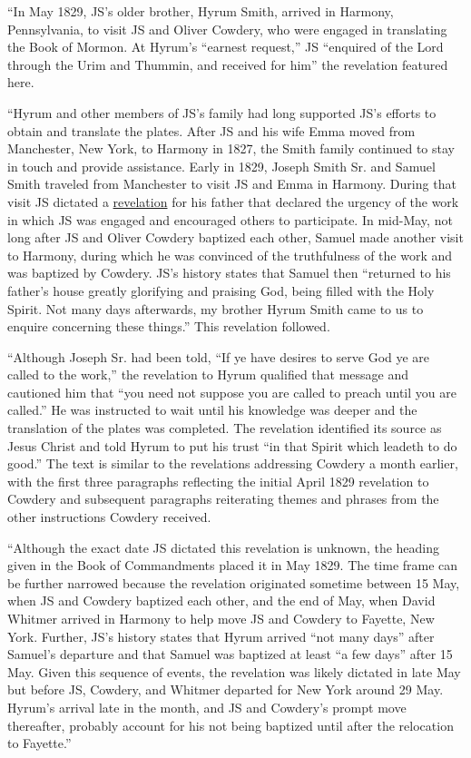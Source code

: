 			``In May 1829, JS's older brother, Hyrum Smith, arrived in Harmony, Pennsylvania, to visit JS and Oliver Cowdery, who were engaged in translating the Book of Mormon. At Hyrum's ``earnest request,'' JS ``enquired of the Lord through the Urim and Thummin, and received for him'' the revelation featured here.
			
			``Hyrum and other members of JS's family had long supported JS's efforts to obtain and translate the plates. After JS and his wife Emma moved from Manchester, New York, to Harmony in 1827, the Smith family continued to stay in touch and provide assistance. Early in 1829, Joseph Smith Sr. and Samuel Smith traveled from Manchester to visit JS and Emma in Harmony. During that visit JS dictated a \hyperref[DC4]{revelation} for his father that declared the urgency of the work in which JS was engaged and encouraged others to participate. In mid-May, not long after JS and Oliver Cowdery baptized each other, Samuel made another visit to Harmony, during which he was convinced of the truthfulness of the work and was baptized by Cowdery. JS's history states that Samuel then ``returned to his father's house greatly glorifying and praising God, being filled with the Holy Spirit. Not many days afterwards, my brother Hyrum Smith came to us to enquire concerning these things.'' This revelation followed.
			
			``Although Joseph Sr. had been told, ``If ye have desires to serve God ye are called to the work,'' the revelation to Hyrum qualified that message and cautioned him that ``you need not suppose you are called to preach until you are called.'' He was instructed to wait until his knowledge was deeper and the translation of the plates was completed. The revelation identified its source as Jesus Christ and told Hyrum to put his trust ``in that Spirit which leadeth to do good.'' The text is similar to the revelations addressing Cowdery a month earlier, with the first three paragraphs reflecting the initial April 1829 revelation to Cowdery and subsequent paragraphs reiterating themes and phrases from the other instructions Cowdery received.
			
			``Although the exact date JS dictated this revelation is unknown, the heading given in the Book of Commandments placed it in May 1829. The time frame can be further narrowed because the revelation originated sometime between 15 May, when JS and Cowdery baptized each other, and the end of May, when David Whitmer arrived in Harmony to help move JS and Cowdery to Fayette, New York. Further, JS's history states that Hyrum arrived ``not many days'' after Samuel's departure and that Samuel was baptized at least ``a few days'' after 15 May. Given this sequence of events, the revelation was likely dictated in late May but before JS, Cowdery, and Whitmer departed for New York around 29 May. Hyrum's arrival late in the month, and JS and Cowdery's prompt move thereafter, probably account for his not being baptized until after the relocation to Fayette.''
			
